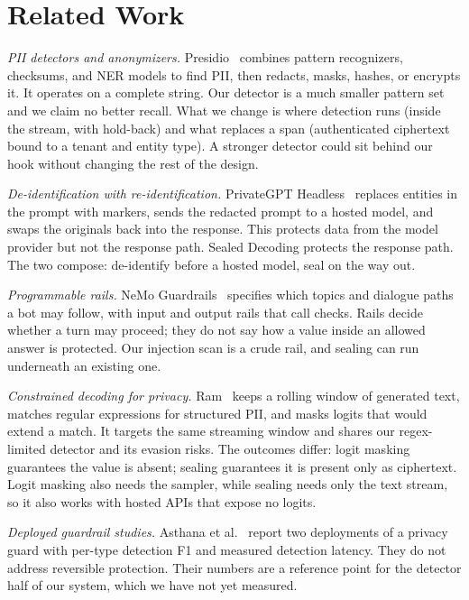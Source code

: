 \documentclass[conference]{IEEEtran}
\begin{document}
\section{Related Work}
\label{sec:related}

\textit{PII detectors and anonymizers.} Presidio~\cite{presidio} combines pattern recognizers, checksums, and NER models to find PII, then redacts, masks, hashes, or encrypts it. It operates on a complete string. Our detector is a much smaller pattern set and we claim no better recall. What we change is where detection runs (inside the stream, with hold-back) and what replaces a span (authenticated ciphertext bound to a tenant and entity type). A stronger detector could sit behind our hook without changing the rest of the design.

\textit{De-identification with re-identification.} PrivateGPT Headless~\cite{privategpt} replaces entities in the prompt with markers, sends the redacted prompt to a hosted model, and swaps the originals back into the response. This protects data from the model provider but not the response path. Sealed Decoding protects the response path. The two compose: de-identify before a hosted model, seal on the way out.

\textit{Programmable rails.} NeMo Guardrails~\cite{rebedea2023nemo} specifies which topics and dialogue paths a bot may follow, with input and output rails that call checks. Rails decide whether a turn may proceed; they do not say how a value inside an allowed answer is protected. Our injection scan is a crude rail, and sealing can run underneath an existing one.

\textit{Constrained decoding for privacy.} Ram~\cite{ram2025constrained} keeps a rolling window of generated text, matches regular expressions for structured PII, and masks logits that would extend a match. It targets the same streaming window and shares our regex-limited detector and its evasion risks. The outcomes differ: logit masking guarantees the value is absent; sealing guarantees it is present only as ciphertext. Logit masking also needs the sampler, while sealing needs only the text stream, so it also works with hosted APIs that expose no logits.

\textit{Deployed guardrail studies.} Asthana et al.~\cite{asthana2025deploying} report two deployments of a privacy guard with per-type detection F1 and measured detection latency. They do not address reversible protection. Their numbers are a reference point for the detector half of our system, which we have not yet measured.
\end{document}
